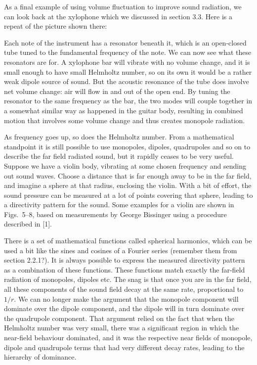   As a final example of using volume fluctuation to improve sound radiation, we 
  can look back at the xylophone which we discussed in section 3.3. Here is a 
  repeat of the picture shown there: 

  Each note of the instrument has a resonator beneath it, which is an 
  open-closed tube tuned to the fundamental frequency of the note. We can now 
  see what these resonators are for. A xylophone bar will vibrate with no 
  volume change, and it is small enough to have small Helmholtz number, so on 
  its own it would be a rather weak dipole source of sound. But the acoustic 
  resonance of the tube does involve net volume change: air will flow in and 
  out of the open end. By tuning the resonator to the same frequency as the 
  bar, the two modes will couple together in a somewhat similar way as happened 
  in the guitar body, resulting in combined motion that involves some volume 
  change and thus creates monopole radiation. 


  As frequency goes up, so does the Helmholtz number. From a mathematical 
  standpoint it is still possible to use monopoles, dipoles, quadrupoles and so 
  on to describe the far field radiated sound, but it rapidly ceases to be very 
  useful. Suppose we have a violin body, vibrating at some chosen frequency and 
  sending out sound waves. Choose a distance that is far enough away to be in 
  the far field, and imagine a sphere at that radius, enclosing the violin. 
  With a bit of effort, the sound pressure can be measured at a lot of points 
  covering that sphere, leading to a directivity pattern for the sound. Some 
  examples for a violin are shown in Figs.\ 5--8, based on measurements by 
  George Bissinger using a procedure described in [1]. 

  There is a set of mathematical functions called spherical harmonics, which 
  can be used a bit like the sines and cosines of a Fourier series (remember 
  them from section 2.2.1?). It is always possible to express the measured 
  directivity pattern as a combination of these functions. These functions 
  match exactly the far-field radiation of monopoles, dipoles etc. The snag is 
  that once you are in the far field, all these components of the sound field 
  decay at the same rate, proportional to $1/r$. We can no longer make the 
  argument that the monopole component will dominate over the dipole component, 
  and the dipole will in turn dominate over the quadrupole component. That 
  argument relied on the fact that when the Helmholtz number was very small, 
  there was a significant region in which the near-field behaviour dominated, 
  and it was the respective near fields of monopole, dipole and quadrupole 
  terms that had very different decay rates, leading to the hierarchy of 
  dominance. 

